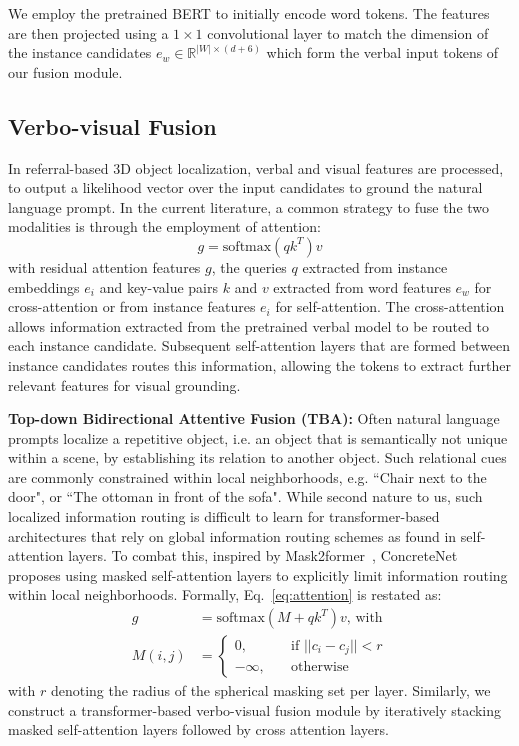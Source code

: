 \documentclass[10pt,twocolumn,letterpaper]{article}
\begin{document}
We employ the pretrained BERT to initially encode word tokens. The  features are then projected using a $1\times1$ convolutional layer to match the dimension of the instance candidates $e_w \in \mathbb{R}^{|W| \times (d+6)}$ which form the verbal input tokens of our fusion module.


\subsection{Verbo-visual Fusion} \label{sec:fusion}

In referral-based 3D object localization, verbal and visual features are processed, to output a likelihood vector over the input candidates to ground the natural language prompt. In the current literature, a common strategy to fuse the two modalities is through the employment of attention:
\begin{equation} \label{eq:attention}
    g = \textrm{softmax}(q k^T) v
\end{equation}
with residual attention features $g$, the queries $q$ extracted from instance embeddings $e_i$ and key-value pairs $k$ and $v$ extracted from word features $e_w$ for cross-attention or from instance features $e_i$ for self-attention. The cross-attention allows information extracted from the pretrained verbal model to be routed to each  instance candidate. Subsequent self-attention layers that are formed between instance candidates routes this information, allowing the tokens to extract further relevant features for visual grounding.

\vspace{5px}
\noindent \textbf{Top-down Bidirectional Attentive Fusion (TBA):} Often natural language prompts localize a repetitive object, i.e. an object that is semantically not unique within a scene, by establishing its relation
to another object. Such relational cues are commonly constrained within local neighborhoods, e.g. ``Chair next to the door", or ``The ottoman in front of the sofa". While second nature to us, such localized information routing is difficult to learn for transformer-based architectures that rely on global information routing schemes as found in self-attention layers. To combat this, inspired by Mask2former~\cite{cheng2022masked}, ConcreteNet~\cite{unal2023ways} proposes using masked self-attention layers to explicitly limit information routing within local neighborhoods. Formally, Eq.~\ref{eq:attention} is restated as:
\begin{equation}
\begin{split}
        g &= \textrm{softmax}(M + q k^T) v \textrm{, \ with} \\
        M(i,j) & = \begin{cases}
        0, & \textrm{if } || c_i - c_j || < r \\
        -\infty,\quad & \textrm{otherwise}
        \end{cases}
\end{split}
\end{equation}
with $r$ denoting the radius of the spherical masking set per layer. Similarly, we construct a transformer-based verbo-visual fusion module by iteratively stacking masked self-attention layers followed by cross attention layers.
\end{document}
